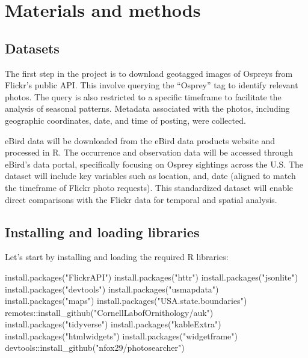\documentclass[
  letterpaper,
  DIV=11,
  numbers=noendperiod]{scrartcl}
\newenvironment{Shaded}{\begin{snugshade}}{\end{snugshade}}
\newcommand{\FunctionTok}[1]{\textcolor[rgb]{0.28,0.35,0.67}{#1}}
\newcommand{\NormalTok}[1]{\textcolor[rgb]{0.00,0.23,0.31}{#1}}
\newcommand{\SpecialCharTok}[1]{\textcolor[rgb]{0.37,0.37,0.37}{#1}}
\newcommand{\StringTok}[1]{\textcolor[rgb]{0.13,0.47,0.30}{#1}}
\begin{document}
\section{Materials and methods}\label{materials-and-methods}

\subsection{Datasets}\label{datasets}

The first step in the project is to download geotagged images of Ospreys
from Flickr's public API. This involve querying the ``Osprey'' tag to
identify relevant photos. The query is also restricted to a specific
timeframe to facilitate the analysis of seasonal patterns. Metadata
associated with the photos, including geographic coordinates, date, and
time of posting, were collected.

eBird data will be downloaded from the eBird data products website and
processed in R. The occurrence and observation data will be accessed
through eBird's data portal, specifically focusing on Osprey sightings
across the U.S. The dataset will include key variables such as location,
and, date (aligned to match the timeframe of Flickr photo requests).
This standardized dataset will enable direct comparisons with the Flickr
data for temporal and spatial analysis.

\subsection{Installing and loading
libraries}\label{installing-and-loading-libraries}

Let's start by installing and loading the required R libraries:

\begin{Shaded}
\begin{Highlighting}[]
\FunctionTok{install.packages}\NormalTok{(}\StringTok{"FlickrAPI"}\NormalTok{)}
\FunctionTok{install.packages}\NormalTok{(}\StringTok{"httr"}\NormalTok{)}
\FunctionTok{install.packages}\NormalTok{(}\StringTok{"jsonlite"}\NormalTok{)}
\FunctionTok{install.packages}\NormalTok{(}\StringTok{"devtools"}\NormalTok{)}
\FunctionTok{install.packages}\NormalTok{(}\StringTok{"usmapdata"}\NormalTok{)}
\FunctionTok{install.packages}\NormalTok{(}\StringTok{"maps"}\NormalTok{)}
\FunctionTok{install.packages}\NormalTok{(}\StringTok{"USA.state.boundaries"}\NormalTok{)}
\NormalTok{remotes}\SpecialCharTok{::}\FunctionTok{install\_github}\NormalTok{(}\StringTok{"CornellLabofOrnithology/auk"}\NormalTok{)}
\FunctionTok{install.packages}\NormalTok{(}\StringTok{"tidyverse"}\NormalTok{)}
\FunctionTok{install.packages}\NormalTok{(}\StringTok{"kableExtra"}\NormalTok{)}
\FunctionTok{install.packages}\NormalTok{(}\StringTok{"htmlwidgets"}\NormalTok{)}
\FunctionTok{install.packages}\NormalTok{(}\StringTok{"widgetframe"}\NormalTok{)}
\NormalTok{devtools}\SpecialCharTok{::}\FunctionTok{install\_github}\NormalTok{(}\StringTok{"nfox29/photosearcher"}\NormalTok{)}
\end{Highlighting}
\end{Shaded}
\end{document}

